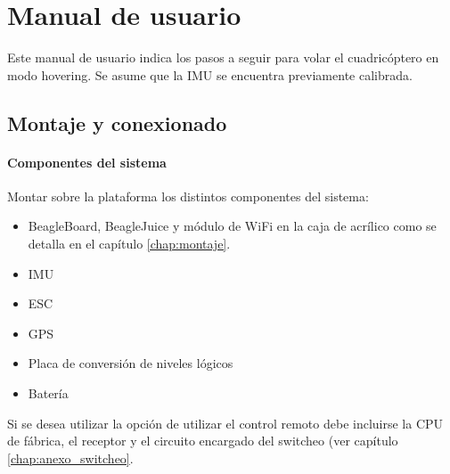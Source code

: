 \documentclass[main]{subfiles}
\begin{document}
\chapter{Manual de usuario}
\label{chap:anexo_manual}

Este manual de usuario indica los pasos a seguir para volar el cuadric\'optero en modo hovering. Se asume que la IMU se encuentra previamente calibrada. 

\section{Montaje y conexionado}

\subsubsection{Componentes del sistema}
Montar sobre la plataforma los distintos componentes del sistema:
\begin{itemize}
\item BeagleBoard, BeagleJuice y m\'odulo de WiFi en la caja de acr\'ilico como se detalla en el cap\'itulo \ref{chap:montaje}.
\item IMU
\item ESC
\item GPS
\item Placa de conversi\'on de niveles l\'ogicos
\item Bater\'ia
\end{itemize}
Si se desea utilizar la opci\'on de utilizar el control remoto debe incluirse la CPU de f\'abrica, el receptor y el circuito encargado del switcheo (ver cap\'itulo \ref{chap:anexo_switcheo}.
\end{document}
